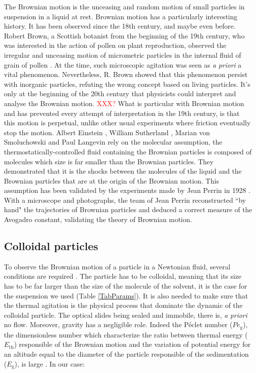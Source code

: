 \documentclass[%
 aip,
 jmp,%
 amsmath,amssymb,
reprint,%
]{revtex4-1}
\begin{document}
The Brownian motion is the unceasing and random motion of small particles in suspension in a liquid at rest. Brownian motion has a particularly interesting history. It has been observed since the 18th century, and maybe even before. Robert Brown, a Scottish botanist from the beginning of the 19th century, who was interested in the action of pollen on plant reproduction, observed the irregular and unceasing motion of micrometric particles in the internal fluid of grain of pollen \citep{13_brown1828brief}. At the time, such microscopic agitation was seen as \textit{a priori} a vital phenomenon. Nevertheless, R. Brown showed that this phenomenon persist with inorganic particles, refuting the wrong concept based on living particles. It's only at the beginning of the 20th century that physicists could interpret and analyse the Brownian motion. \textcolor{red}{XXX?} What is particular with Brownian motion and has prevented every attempt of interpretation in the 19th century, is that this motion is perpetual, unlike other usual experiments where friction eventually stop the motion. Albert Einstein \citep{9_einstein1906theory}, William Sutherland \citep{14_sutherland1905lxxv}, Marian von Smoluchowski \citep{10_von1906kinetischen} and Paul Langevin \citep{15_Langevin} rely on the molecular assumption, the thermostatically-controlled fluid containing the Brownian particles is composed of molecules which size is far smaller than the Brownian particles. They demonstrated that it is the shocks between the molecules of the liquid and the Brownian particles that are at the origin of the Brownian motion. This assumption has been validated by the experiments made by Jean Perrin in 1928 \citep{22_perrin2014atomes}. With a microscope and photographs, the team of Jean Perrin reconstructed ``by hand" the trajectories of Brownian particles and deduced a correct measure of the Avogadro constant, validating the theory of Brownian motion.

\subsection{Colloidal particles}

To observe the Brownian motion of a particle in a Newtonian fluid, several conditions are required \citep{16_CollSusp}. The particle has to be colloidal, meaning that its size has to be far larger than the size of the molecule of the solvent, it is the case for the suspension we used (Table \ref{TabParams}). It is also needed to make sure that the thermal agitation is the physical process that dominate the dynamic of the colloidal particle. The optical slides being sealed and immobile, there is, \textit{a priori} no flow. Moreover, gravity has a negligible role. Indeed the P\'eclet number ($Pe_\text{g}$), the dimensionless number which characterize the ratio between thermal energy ($E_\text{th}$) responsible of the Brownian motion and the variation of potential energy for an altitude equal to the diameter of the particle responsible of the sedimentation ($E_\text{g}$), is large \citep{12_patankar1980numerical}. In our case:
\end{document}

